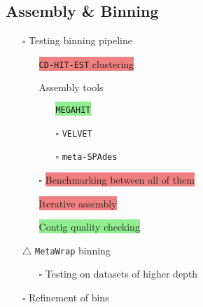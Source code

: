\documentclass[11pt]{report}
\newcommand{\done}{\checkmark}  %
\newcommand{\pending}{$\square$}  %
\newcommand{\issue}{$\triangle$}  %
\newcommand{\draft}{\faPencil}
\newcommand{\highlightessential}[1]{\colorbox{lightgreen}{#1}}  %
\newcommand{\highlightoptional}[1]{\colorbox{lightorange}{#1}}  %
\newcommand{\highlightrobust}[1]{\colorbox{lightcoral}{#1}}  %
\begin{document}
\begin{multicols}{2}
\section*{Assembly \& Binning}
\begin{itemize}
	\item [\pending] Testing binning pipeline
	\begin{itemize}
		\item [\done] \highlightrobust{\texttt{CD-HIT-EST} clustering}
		\item [\done] Assembly tools
		\begin{itemize}
			\item [\done] \highlightessential{\texttt{MEGAHIT}}
			\item [\pending] \highlightoptional{\texttt{VELVET}}
			\item [\pending] \highlightoptional{\texttt{meta-SPAdes}}
		\end{itemize}
		\item [\pending] \highlightrobust{Benchmarking between all of them}
		\item [\draft] \highlightrobust{Iterative assembly}
		\item [\draft] \highlightessential{Contig quality checking}
	\end{itemize}
	\item [\issue] \texttt{MetaWrap} binning
	\begin{itemize}
		\item [\pending] Testing on datasets of higher depth
	\end{itemize}
	\item [\pending] Refinement of bins
\end{itemize}


	

\end{multicols}
\end{document}
